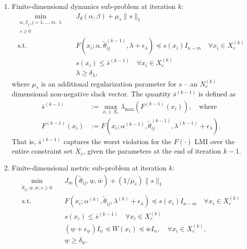 \documentclass[conference]{svproc}
\newcommand{\wl}{\underline{w}}
\newcommand{\wu}{\overline{w}}
\newcommand{\xs}{x_i}
\begin{document}
\begin{leftbox}
\begin{enumerate}
\item Finite-dimensional dynamics sub-problem at iteration $k$:
\begin{subequations} \label{finite_dyn}
\begin{align}
    \min_{\substack{\alpha,\beta_j, j=1,\ldots,m,\ \lambda \\ s \geq 0}} \quad & J_d(\alpha,\beta) + \mu_s\|s\|_1 \\
    \text{s.t.} \quad & F(\xs;\alpha,\tilde{\theta}^{(k-1)}_{ij}, \lambda + \epsilon_{\lambda}) \preceq s(\xs)I_{n-m}  \quad \forall \xs \in X_c^{(k)} \\
    \quad & s(\xs) \leq \bar{s}^{(k-1)}  \quad \forall \xs \in X_c^{(k)}\\
    \quad & \lambda \geq \delta_{\lambda},
\end{align}
\end{subequations}
where $\mu_s$ is an additional regularization parameter for $s$ -- an $N_c^{(k)}$ dimensional non-negative slack vector. The quantity $\bar{s}^{(k-1)}$ is defined as
\[
    \begin{split}
    \bar{s}^{(k-1)} &:= \max_{\xs \in X_c} \lambda_{\max} \left(F^{(k-1)}(\xs)\right), \quad \text{where} \\
    F^{(k-1)}(\xs) &:= F(\xs;\alpha^{(k-1)},\tilde{\theta}^{(k-1)}_{ij}, \lambda^{(k-1)} +\epsilon_{\lambda}).
    \end{split}
\]
That is, $\bar{s}^{(k-1)}$ captures the worst violation for the $F(\cdot)$ LMI over the entire constraint set $X_c$, given the parameters at the end of iteration $k-1$. 
\item Finite-dimensional metric sub-problem at iteration $k$:
\begin{subequations}\label{finite_met}
\begin{align}
    \min_{\tilde{\theta}_{ij},\wl,\wu,  s \geq 0} \quad & J_m(\tilde{\theta}_{ij},\wl,\wu) + (1/\mu_s)\|s\|_1 \\
    \text{s.t.} \quad & F(\xs;\alpha^{(k)},\tilde{\theta}_{ij}, \lambda^{(k)} + \epsilon_{\lambda}) \preceq s(\xs)I_{n-m}  \quad \forall \xs \in X_c^{(k)} \\
    \quad & s(\xs) \leq \bar{s}^{(k-1)} \quad \forall \xs \in X_c^{(k)} \\
    \quad &  (\wl + \epsilon_{\wl})I_{n} \preceq W(\xs) \preceq \wu I_n, \quad \forall \xs \in X_c^{(k)}, \\
    \quad & \wl \geq \delta_{\wl}.
\end{align}
\end{subequations}


\end{enumerate}
\end{leftbox}
\end{document}
